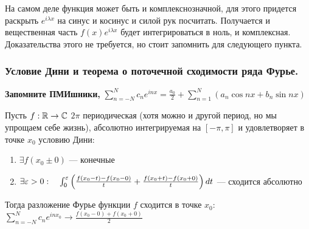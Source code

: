 На самом деле функция может быть и комплекснозначной, для этого придется раскрыть $e^{i\lambda x}$
на синус и косинус и силой рук посчитать. Получается и вещественная часть $f(x) e^{i\lambda x}$
будет интегрироваться в ноль, и комплексная.
Доказательства этого не требуется, но стоит запомнить для следующего пункта.

\subsubsection{Условие Дини и теорема о поточечной сходимости ряда Фурье.}
\textbf{Запомните ПМИшники, }
$\sum_{n = -N}^N c_n e^{inx} = \frac{a_0}{2} + \sum_{n=1}^{N} \left( a_n \cos nx + b_n \sin nx \right)$

\begin{theorem*}
Пусть $f: \mathbb{R} \to \mathbb{C}$ $2 \pi$ периодическая (хотя можно и другой период, но мы упрощаем себе жизнь),
абсолютно интегрируемая на $[-\pi, \pi]$ и удовлетворяет в точке $x_0$ условию Дини:
\begin{enumerate}
\item $\exists f(x_0 \pm 0) $ — конечные
\item $\exists \varepsilon > 0: \quad
    \int_0^{\varepsilon} \left( \frac{f(x_0 - t) - f(x_0 - 0)}{t} + \frac{f(x_0 + t) - f(x_0 + 0)}{t} \right) dt$
    — сходится абсолютно
\end{enumerate}

Тогда разложение Фурье функции $f$ сходится в точке $x_0$:
$\sum_{n=-N}^{N} c_n e^{inx_0} \to \frac{f(x_0 - 0) + f(x_0 + 0)}{2} $

\end{theorem*}

